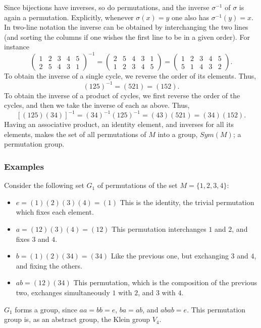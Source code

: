Since bijections have inverses, so do permutations, and the inverse $\sigma^{-1}$ of $\sigma$ is again a
permutation. Explicitly, whenever $\sigma(x)=y$ one also has $\sigma^{-1}(y)=x$. In two-line notation the inverse
can be obtained by interchanging the two lines (and sorting the columns if one wishes the first line to be in a
given order). For instance
$$
    \begin{pmatrix}1&2&3&4&5\\2&5&4&3&1\end{pmatrix}^{-1}
    =\begin{pmatrix}2&5&4&3&1\\1&2&3&4&5\end{pmatrix}
    =\begin{pmatrix}1&2&3&4&5\\5&1&4&3&2\end{pmatrix}.
$$
To obtain the inverse of a single cycle, we reverse the order of its elements. Thus,
$$(125)^{-1}=(521)=(152).$$
To obtain the inverse of a product of cycles, we first reverse the order of the cycles, and then we take the
inverse of each as above. Thus,
$$[(125)(34)]^{-1}=(34)^{-1}(125)^{-1}=(43)(521)=(34)(152).$$
Having an associative product, an identity element, and inverses for all its elements, makes the set of all
permutations of $M$ into a group, $Sym(M)$; a permutation group.

\subsubsection{Examples}
Consider the following set $G_1$ of permutations of the set $M = \{1, 2, 3, 4\}$:
\begin{itemize}
    \item $e = (1)(2)(3)(4) = (1)$
          This is the identity, the trivial permutation which fixes each element.
    \item $a = (1 2)(3)(4) = (1 2)$
          This permutation interchanges $1$ and $2$, and fixes $3$ and $4$.
    \item $b = (1)(2)(3 4) = (3 4)$
          Like the previous one, but exchanging $3$ and $4$, and fixing the others.
    \item $ab = (1 2)(3 4)$
          This permutation, which is the composition of the previous two, exchanges simultaneously $1$ with $2$,
          and $3$ with $4$.
\end{itemize}
$G_1$ forms a group, since $aa = bb = e$, $ba = ab$, and $abab = e$. This permutation group is,
as an abstract group, the Klein group $V_4$.

